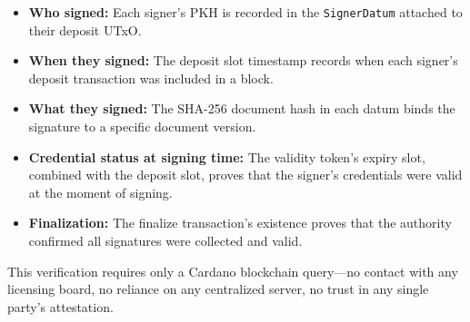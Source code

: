 \begin{itemize}[nosep]
  \item \textbf{Who signed:}  Each signer's PKH is recorded in the
    \texttt{SignerDatum} attached to their deposit UTxO.
  \item \textbf{When they signed:}  The deposit slot timestamp records
    when each signer's deposit transaction was included in a block.
  \item \textbf{What they signed:}  The SHA-256 document hash in each
    datum binds the signature to a specific document version.
  \item \textbf{Credential status at signing time:}  The validity token's
    expiry slot, combined with the deposit slot, proves that the signer's
    credentials were valid at the moment of signing.
  \item \textbf{Finalization:}  The finalize transaction's existence proves
    that the authority confirmed all signatures were collected and valid.
\end{itemize}

This verification requires only a Cardano blockchain query---no contact with
any licensing board, no reliance on any centralized server, no trust in any
single party's attestation.


